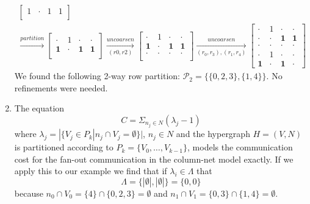 \documentclass[../main.tex]{subfiles}
\begin{document}
\begin{solution}
\begin{enumerate}
\begin{equation}
\begin{multlined}
\begin{bmatrix}
		1 & \cdot & 1 & 1 \\
		\end{bmatrix}
		\\
		\xrightarrow[]{partition}
		\begin{bmatrix}
		\cdot & 1 & \cdot & \cdot \\
		\mathbf{1} & \cdot & \mathbf{1} & \mathbf{1} \\
		\end{bmatrix}
		\xrightarrow[(r0,r2)]{uncoarsen}
		\begin{bmatrix}
		\cdot & 1 & \cdot & \cdot \\
		\mathbf{1} & \cdot & \mathbf{1} & \mathbf{1} \\
		\cdot & \cdot & \cdot & \cdot \\
		\end{bmatrix}
		\xrightarrow[(r_0,r_3),(r_1,r_4)]{uncoarsen}
		\begin{bmatrix}
		\cdot & 1 & \cdot & \cdot \\
		\cdot & \cdot & \mathbf{1} & \mathbf{1} \\
		\cdot & \cdot & \cdot & \cdot \\
		\cdot & 1 & \cdot & \cdot \\
		\mathbf{1} & \cdot & \mathbf{1} & \cdot
		\end{bmatrix}
	\end{multlined}
	\end{equation}
	We found the following 2-way row partition: $\mathcal{P}_2 = \{\{0,2,3\},\{1,4\}\}$. No refinements were needed.
	\item The equation
		\begin{equation}
			C = \Sigma_{n_j \in N} (\lambda_j - 1)
		\end{equation}
		where $\lambda_j = |\{V_j \in P_k | n_j \cap V_j = \emptyset \} |$, $n_j \in N$ and the hypergraph $H=(V,N)$ is partitioned according to $P_k = \{V_0, \ldots, V_{k-1}\}$, models the communication cost for the fan-out communication in the column-net model exactly. If we apply this to our example we find that if $\lambda_i \in \Lambda$ that
		\begin{equation}
			\Lambda = \{|\emptyset|,|\emptyset|\} = \{0,0\}
		\end{equation}
		because $n_0 \cap V_0 = \{4\} \cap \{0,2,3\} = \emptyset$ and $n_1 \cap V_1 = \{0,3\} \cap \{1,4\} = \emptyset$.
\end{enumerate}

\end{solution}
\end{document}

